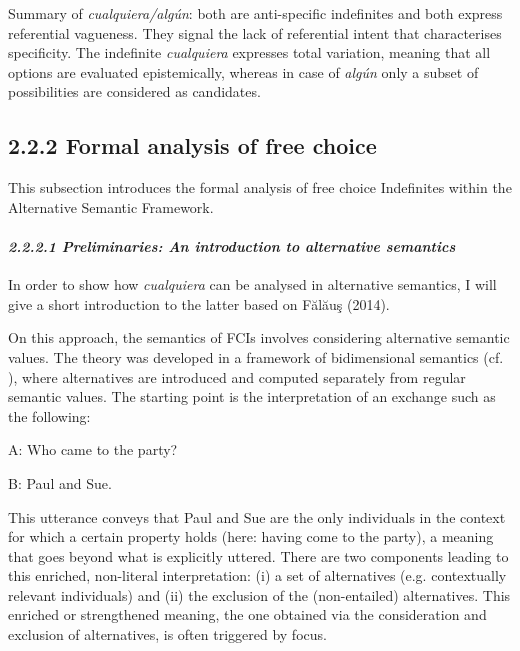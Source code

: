   Summary of \textit{cualquiera/algún}: both are anti-specific indefinites and both express referential vagueness. They signal the lack of referential intent that characterises specificity. The indefinite \textit{cualquiera} expresses total variation, meaning that all options are evaluated epistemically, whereas in case of \textit{algún} only a subset of possibilities are considered as candidates. 

\subsection{\textbf{2.2.2} \textbf{Formal} \textbf{analysis} \textbf{of} \textbf{free} \textbf{choice}}

This subsection introduces the formal analysis of free choice Indefinites within the Alternative Semantic Framework.

\paragraph{\textit{2.2.2.1 Preliminaries: An introduction to alternative semantics}}

In order to show how \textit{cualquiera} can be analysed in alternative semantics, I will give a short introduction to the latter based on Fălăuş (2014).

  On this approach, the semantics of FCIs involves considering alternative semantic values. The theory was developed in a framework of bidimensional semantics (cf. \citealt{Rooth1985}), where alternatives are introduced and computed separately from regular semantic values. The starting point is the interpretation of an exchange such as the following:

  A: Who came to the party? 

B: Paul and Sue.

This utterance conveys that Paul and Sue are the only individuals in the context for which a certain property holds (here: having come to the party), a meaning that goes beyond what is explicitly uttered. There are two components leading to this enriched, non-literal interpretation: (i) a set of alternatives (e.g. contextually relevant individuals) and (ii) the exclusion of the (non-entailed) alternatives. This enriched or strengthened meaning, the one obtained via the consideration and exclusion of alternatives, is often triggered by focus.

